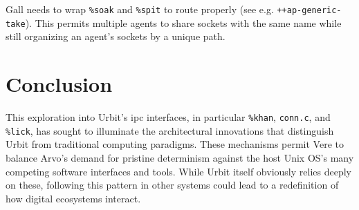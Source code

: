 \documentclass[twoside]{article}
\begin{document}
Gall needs to wrap \lstinline[style=inlinecode]{%soak} and \lstinline[style=inlinecode]{%spit} to route properly (see e.g. \lstinline[style=inlinecode]{++ap-generic-take}).  This permits multiple agents to share sockets with the same name while still organizing an agent's sockets by a unique path.


\section{Conclusion}

This exploration into Urbit's {\sc ipc} interfaces, in particular \texttt{\%khan}, \texttt{conn.c}, and \texttt{\%lick}, has sought to illuminate the architectural innovations that distinguish Urbit from traditional computing paradigms.  These mechanisms permit Vere to balance Arvo's demand for pristine determinism against the host Unix OS's many competing software interfaces and tools.  While Urbit itself obviously relies deeply on these, following this pattern in other systems could lead to a redefinition of how digital ecosystems interact. \tombstone{}

\printbibliography
\end{document}
